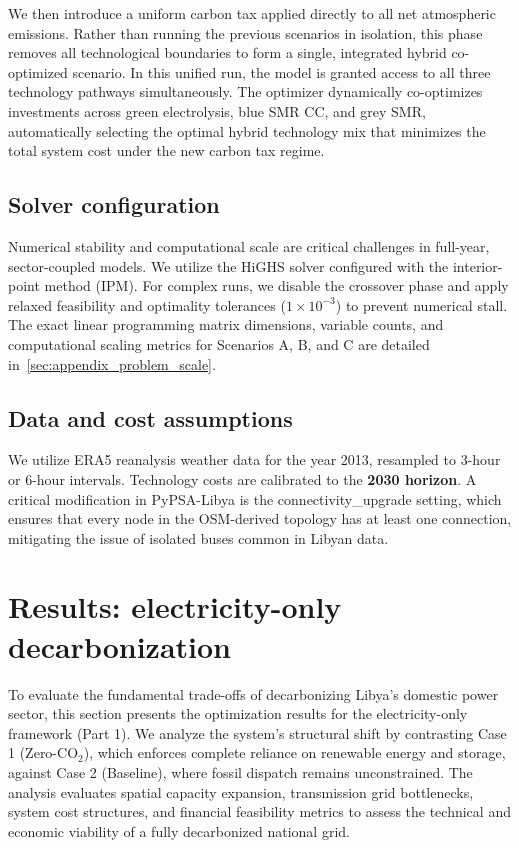 \documentclass[preprint,12pt]{elsarticle}
\begin{document}
We then introduce a uniform carbon tax applied directly to all net atmospheric emissions. Rather than running the previous scenarios in isolation, this phase removes all technological boundaries to form a single, integrated hybrid co-optimized scenario. In this unified run, the model is granted access to all three technology pathways simultaneously. The optimizer dynamically co-optimizes investments across green electrolysis, blue SMR CC, and grey SMR, automatically selecting the optimal hybrid technology mix that minimizes the total system cost under the new carbon tax regime.



\subsection{Solver configuration}
Numerical stability and computational scale are critical challenges in full-year, sector-coupled models. We utilize the HiGHS solver configured with the interior-point method (IPM). For complex runs, we disable the crossover phase and apply relaxed feasibility and optimality tolerances ($1 \times 10^{-3}$) to prevent numerical stall. The exact linear programming matrix dimensions, variable counts, and computational scaling metrics for Scenarios A, B, and C are detailed in~\ref{sec:appendix_problem_scale}.

\subsection{Data and cost assumptions}
We utilize ERA5 reanalysis weather data for the year 2013, resampled to 3-hour or 6-hour intervals. Technology costs are calibrated to the \textbf{2030 horizon}. A critical modification in \textsf{PyPSA-Libya} is the \textsf{connectivity\_upgrade} setting, which ensures that every node in the OSM-derived topology has at least one connection, mitigating the issue of isolated buses common in Libyan data.

\section{Results: electricity-only decarbonization}
\label{sec:results_electricity_only}

To evaluate the fundamental trade-offs of decarbonizing Libya's domestic power sector, this section presents the optimization results for the electricity-only framework (Part 1). We analyze the system's structural shift by contrasting Case 1 (Zero-$\text{CO}_2$), which enforces complete reliance on renewable energy and storage, against Case 2 (Baseline), where fossil dispatch remains unconstrained. The analysis evaluates spatial capacity expansion, transmission grid bottlenecks, system cost structures, and financial feasibility metrics to assess the technical and economic viability of a fully decarbonized national grid.
\end{document}

